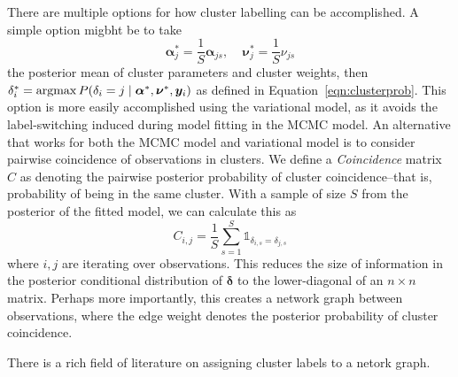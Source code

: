 There are multiple options for how cluster labelling can be accomplished.  A
    simple option migbht be to take
    \[
        \bm{\alpha}_j^* = \frac{1}{S}\bm{\alpha}_{js},\;\;\;\;
        \bm{\nu}_j^* = \frac{1}{S}\nu_{js}
    \]
    the posterior mean of cluster parameters and cluster weights, then 
    $\delta_i^{*} = \operatorname*{argmax} P(\delta_i = j\mid\bm{\alpha}^*,\bm{\nu}^*,\bm{y}_i)$
    as defined in Equation~\ref{eqn:clusterprob}.  This option is more easily
    accomplished using the variational model, as it avoids the label-switching 
    induced during model fitting in the MCMC model.
    An alternative that works for both the MCMC model and variational model
    is to consider pairwise coincidence of observations in clusters.
    We define a \emph{Coincidence} matrix $C$ as
    denoting the pairwise posterior probability of cluster coincidence--that is,
    probability of being in the same cluster.  With a sample of size $S$ from
    the posterior of the fitted model, we can calculate this as
    \begin{equation}
        \label{eqn:coincidencemat}
        C_{i,j} = \frac{1}{S}\sum_{s = 1}^S\mathbb{1}_{\delta_{i,s} = \delta_{j,s}}
    \end{equation}
    where $i,j$ are iterating over observations. This reduces the size of 
    information in the posterior conditional distribution of $\bm{\delta}$
    to the lower-diagonal of an $n\times n$ matrix.  Perhaps more importantly,
    this creates a network graph between observations, where the edge weight
    denotes the posterior probability of cluster coincidence.

There is a rich field of literature on assigning cluster labels to a netork graph.
    






















